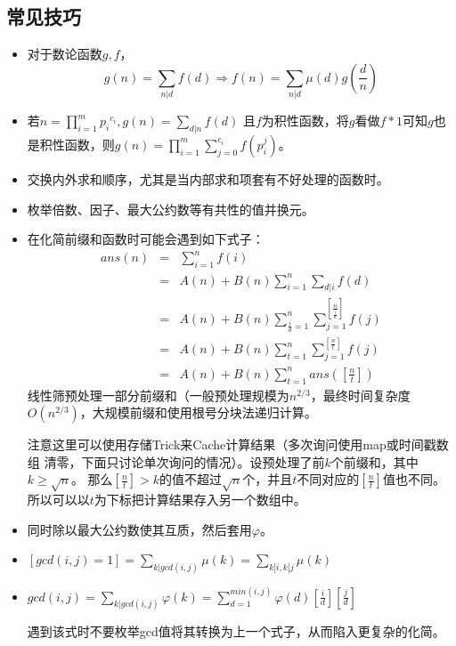\subsection{常见技巧}
\begin{itemize}
	\item
	      对于数论函数$g,f$，
	      \begin{displaymath}
		      g(n)=\sum_{n|d}{f(d)}\Rightarrow
		      f(n)=\sum_{n|d}{\mu(d)g(\frac{d}{n})}
	      \end{displaymath}
	\item
	      若$\displaystyle n=\prod_{i=1}^m{{p_i}^{c_i}},g(n)=\sum_{d|n}{f(d)}$
	      且$f$为积性函数，将$g$看做$f*1$可知$g$也是积性函数，则$\displaystyle
		      g(n)=\prod_{i=1}^m{\sum_{j=0}^{c_i}{f(p_i^j)}}$。
	\item 交换内外求和顺序，尤其是当内部求和项套有不好处理的函数时。
	\item 枚举倍数、因子、最大公约数等有共性的值并换元。
	\item 在化简前缀和函数时可能会遇到如下式子：
	      \begin{eqnarray*}
		      ans(n)&=&\sum_{i=1}^n{f(i)}\\
		      &=&A(n)+B(n)\sum_{i=1}^n{\sum_{d|i}{f(d)}}\\
		      &=&A(n)+B(n)\sum_{\frac{i}{d}=1}^n{\sum_{j=1}^{\left[\frac{n}{\frac{i}{d}}\right]}{f(j)}}\\
		      &=&A(n)+B(n)\sum_{t=1}^n{\sum_{j=1}^{[\frac{n}{t}]}{f(j)}}\\
		      &=&A(n)+B(n)\sum_{t=1}^n{ans([\frac{n}{t}])}
	      \end{eqnarray*}
	      线性筛预处理一部分前缀和（一般预处理规模为$n^{2/3}$，最终时间复杂度
	      $O(n^{2/3})$，大规模前缀和使用根号分块法递归计算。

	      注意这里可以使用存储Trick来Cache计算结果（多次询问使用map或时间戳数组
	      清零，下面只讨论单次询问的情况）。设预处理了前$k$个前缀和，其中$k\geq \sqrt{n}$。
		那么$[\frac{n}{t}]>k$的值不超过$\sqrt{n}$个，并且$t$不同对应的$[\frac{n}{t}]$值也不同。
		所以可以以$t$为下标把计算结果存入另一个数组中。
	\item 同时除以最大公约数使其互质，然后套用$\varphi$。
	\item $\displaystyle [gcd(i,j)=1]=\sum_{k|gcd(i,j)}\mu(k)=\sum_{k|i,k|j}\mu(k)$
	\item $\displaystyle gcd(i,j)=\sum_{k|gcd(i,j)}{\varphi(k)}=\sum_{d=1}^{min(i,j)}{\varphi(d)[\frac{i}{d}][\frac{j}{d}]}$

		遇到该式时不要枚举gcd值将其转换为上一个式子，从而陷入更复杂的化简。


\end{itemize}
